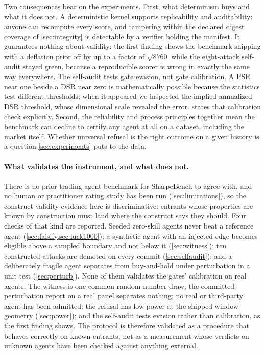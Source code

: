 Two consequences bear on the experiments. First, what determinism buys and what it does not. A deterministic kernel supports replicability and auditability: anyone can recompute every score, and tampering within the declared digest coverage of \cref{sec:integrity} is detectable by a verifier holding the manifest. It guarantees nothing about validity: the first finding shows the benchmark shipping with a deflation prior off by up to a factor of $\sqrt{8760}$ while the eight-attack self-audit stayed green, because a reproducible scorer is wrong in exactly the same way everywhere. The self-audit tests gate evasion, not gate calibration. A PSR near one beside a DSR near zero is mathematically possible because the statistics test different thresholds; when it appeared we inspected the implied annualized DSR threshold, whose dimensional scale revealed the error.  states that calibration check explicitly. Second, the reliability and process principles together mean the benchmark can decline to certify any agent at all on a dataset, including the market itself. Whether universal refusal is the right outcome on a given history is a question \cref{sec:experiments} puts to the data.

\paragraph{What validates the instrument, and what does not.} There is no prior trading-agent benchmark for SharpeBench to agree with, and no human or practitioner rating study has been run (\cref{sec:limitations}), so the construct-validity evidence here is discriminative: entrants whose properties are known by construction must land where the construct says they should. Four checks of that kind are reported. Seeded zero-skill agents never beat a reference agent (\cref{sec:falsify,sec:luck1000}); a synthetic agent with an injected edge becomes eligible above a sampled boundary and not below it (\cref{sec:witness}); ten constructed attacks are demoted on every commit (\cref{sec:selfaudit}); and a deliberately fragile agent separates from buy-and-hold under perturbation in a unit test (\cref{sec:perturb}). None of them validates the gates' calibration on real agents. The witness is one common-random-number draw; the committed perturbation report on a real panel separates nothing; no real or third-party agent has been admitted; the refusal has low power at the shipped window geometry (\cref{sec:power}); and the self-audit tests evasion rather than calibration, as the first finding shows. The protocol is therefore validated as a procedure that behaves correctly on known entrants, not as a measurement whose verdicts on unknown agents have been checked against anything external.
